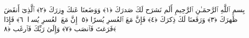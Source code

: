 
  
    
  
    
    

\nopagebreak
  بِسمِ ٱللَّهِ ٱلرَّحمَـٰنِ ٱلرَّحِيمِ
  أَلَم نَشرَح لَكَ صَدرَكَ ﴿١﴾
 وَوَضَعنَا عَنكَ وِزرَكَ ﴿٢﴾
 ٱلَّذِىٓ أَنقَضَ ظَهرَكَ ﴿٣﴾
 وَرَفَعنَا لَكَ ذِكرَكَ ﴿٤﴾
 فَإِنَّ مَعَ ٱلعُسرِ يُسرًا ﴿٥﴾
 إِنَّ مَعَ ٱلعُسرِ يُسرًۭا ﴿٦﴾
 فَإِذَا فَرَغتَ فَٱنصَب ﴿٧﴾
 وَإِلَىٰ رَبِّكَ فَٱرغَب ﴿٨﴾
 
